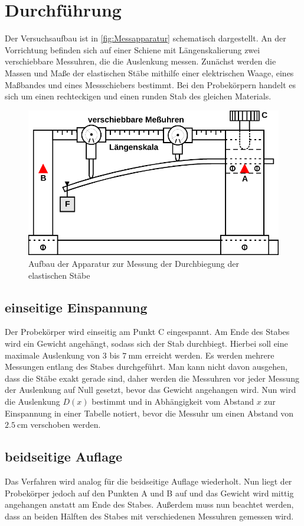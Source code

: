 \section{Durchführung}
\label{sec:Durchführung}

Der Versuchsaufbau ist in \autoref{fig:Messapparatur} schematisch dargestellt.
An der Vorrichtung befinden sich auf einer Schiene mit Längenskalierung zwei verschiebbare Messuhren, die die Auslenkung messen.
Zunächst werden die Massen und Maße der elastischen Stäbe mithilfe einer elektrischen Waage, eines Maßbandes und eines Messschiebers bestimmt.
Bei den Probekörpern handelt es sich um einen rechteckigen und einen runden Stab des gleichen Materials.

\begin{figure}
    \centering
    \includegraphics{content/Messapparat.pdf}
    \caption{Aufbau der Apparatur zur Messung der Durchbiegung der elastischen Stäbe\cite[111]{V103}}
    \label{fig:Messapparatur}
\end{figure}

\subsection{einseitige Einspannung}
Der Probekörper wird einseitig am Punkt C eingespannt. 
Am Ende des Stabes wird ein Gewicht angehängt, sodass sich der Stab durchbiegt. 
Hierbei soll eine maximale Auslenkung von $\num{3}$ bis $\qty{7}{\milli\meter}$ erreicht werden.
Es werden mehrere Messungen entlang des Stabes durchgeführt.
Man kann nicht davon ausgehen, dass die Stäbe exakt gerade sind, daher werden die Messuhren vor jeder Messung der Auslenkung auf Null gesetzt,
bevor das Gewicht angehangen wird.
Nun wird die Auslenkung $D(x)$ bestimmt und in Abhängigkeit vom Abstand $x$ zur Einspannung in einer Tabelle notiert, 
bevor die Messuhr um einen Abstand von $\qty{2,5}{\centi\meter}$ verschoben werden.

\subsection{beidseitige Auflage}
Das Verfahren wird analog für die beidseitige Auflage wiederholt. Nun liegt der Probekörper jedoch auf den Punkten A und B auf und das Gewicht wird mittig 
angehangen anstatt am Ende des Stabes. Außerdem muss nun beachtet werden, dass an beiden Hälften des Stabes mit verschiedenen Messuhren gemessen wird.




